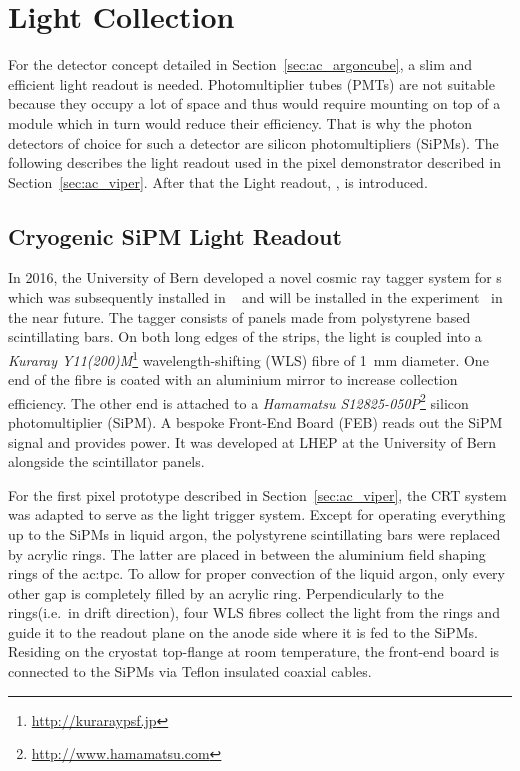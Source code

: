 \section{Light Collection}
\label{sec:studies_light-col}

For the \AC{} detector concept detailed in Section~\ref{sec:ac_argoncube}, a slim and efficient light readout is needed.
Photomultiplier tubes (PMTs) are not suitable because they occupy a lot of space and thus would require mounting on top of a module which in turn would reduce their efficiency.
That is why the photon detectors of choice for such a detector are silicon photomultipliers (SiPMs).
The following describes the light readout used in the \AC{} pixel demonstrator described in Section~\ref{sec:ac_viper}.
After that the \AC{} Light readout, \AL{}, is introduced.


\subsection{Cryogenic SiPM Light Readout}
\label{sec:studies_light-col_viper}

In 2016, the University of Bern developed a novel cosmic ray tagger system for \lartpc{}s which was subsequently installed in \uboone{}~\cite{uboone} and will be installed in the \sbnd{} experiment~\cite{sbnd} in the near future.
The tagger consists of panels made from polystyrene based scintillating bars.
On both long edges of the strips, the light is coupled into a \emph{Kuraray Y11(200)M}\footnote{\url{http://kuraraypsf.jp}} wavelength-shifting (WLS) fibre of \SI{1}{\milli\metre} diameter.
One end of the fibre is coated with an aluminium mirror to increase collection efficiency.
The other end is attached to a \emph{Hamamatsu S12825-050P}\footnote{\url{http://www.hamamatsu.com}} silicon photomultiplier (SiPM).
A bespoke Front-End Board (FEB) reads out the SiPM signal and provides power.
It was developed at LHEP at the University of Bern alongside the scintillator panels\cite{crt_feb}.

For the first pixel prototype described in Section~\ref{sec:ac_viper}, the CRT system was adapted to serve as the light trigger system.
Except for operating everything up to the SiPMs in liquid argon, the polystyrene scintillating bars were replaced by acrylic rings.
The latter are placed in between the aluminium field shaping rings of the \gls{ac:tpc}.
To allow for proper convection of the liquid argon, only every other gap is completely filled by an acrylic ring.
Perpendicularly to the rings(i.e.\ in drift direction), four WLS fibres collect the light from the rings and guide it to the readout plane on the anode side where it is fed to the SiPMs.
Residing on the cryostat top-flange at room temperature, the front-end board is connected to the SiPMs via Teflon insulated coaxial cables.

